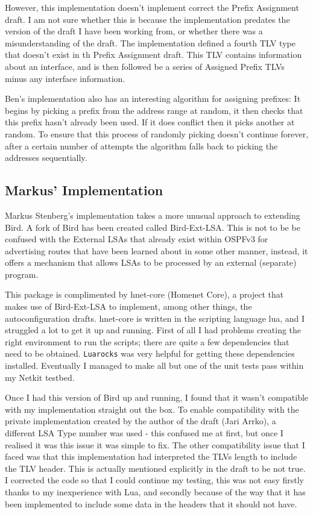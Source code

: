 \documentclass[12pt]{report}
\begin{document}
However, this implementation doesn't implement correct the Prefix Assignment
draft. I am not sure whether this is because the implementation predates the
version of the draft I have been working from, or whether there was a
misunderstanding of the draft. The implementation defined a fourth TLV type
that doesn't exist in th Prefix Assignment draft. This TLV contains information
about an interface, and is then followed be a series of Assigned Prefix TLVs
minus any interface information. 

Ben's implementation also has an interesting algorithm for assigning prefixes:
It begins by picking a prefix from the address range at random, it then checks
that this prefix hasn't already been used. If it does conflict then it picks
another at random. To ensure that this process of randomly picking doesn't
continue forever, after a certain number of attempts the algorithm falls back
to picking the addresses sequentially. 

\subsection{Markus' Implementation}
Markus Stenberg's implementation takes a more unusual approach to extending
Bird. A fork of Bird has been created called Bird-Ext-LSA\@. This is not to be
be confused with the External LSAs that already exist within OSPFv3 for
advertising routes that have been learned about in some other manner, instead,
it offers a mechanism that allows LSAs to be processed by an external
(separate) program. 

This package is complimented by hnet-core (Homenet Core), a project that makes
use of Bird-Ext-LSA to implement, among other things, the autoconfiguration
drafts\@. hnet-core is written in the scripting language lua, and I struggled a
lot to get it up and running. First of all I had problems creating the right
environment to run the scripts; there are quite a few dependencies that need to
be obtained. \texttt{Luarocks} was very helpful for getting these dependencies
installed. Eventually I managed to make all but one of the unit tests pass
within my Netkit testbed.

Once I had this version of Bird up and running, I found that it wasn't
compatible with my implementation straight out the box. To enable compatibility
with the private implementation created by the author of the draft (Jari Arrko),
a different LSA Type number was used - this confused me at first, but once I
realised it was this issue it was simple to fix. The other compatibility issue
that I faced was that this implementation had interpreted the TLVs length to
include the TLV header. This is actually mentioned explicitly in the draft to
be not true. I corrected the code so that I could continue my testing, this was
not easy firstly thanks to my inexperience with Lua, and secondly because of
the way that it has been implemented to include some data in the headers that
it should not have.  
\end{document}
